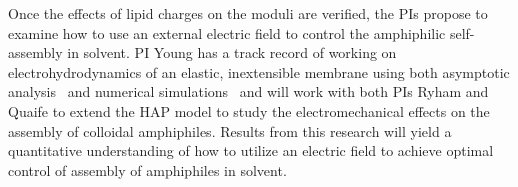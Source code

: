 Once the effects of lipid charges on the moduli are verified, the PIs
propose to examine how to use an external electric field to control the
amphiphilic self-assembly in solvent. PI Young has a track record of
working on electrohydrodynamics of an elastic, inextensible membrane
using both asymptotic analysis~\cite{Nganguia2013_PRE, Young2014_JFM,
Young2015_PoF} and numerical simulations~\cite{Nganguia2015_CiCP} and
will work with both PIs Ryham and Quaife to extend the HAP model to
study the electromechanical effects on the assembly of colloidal amphiphiles.
Results from this research will yield a quantitative understanding of
how to utilize an electric field to achieve optimal control of assembly
of amphiphiles in solvent.




